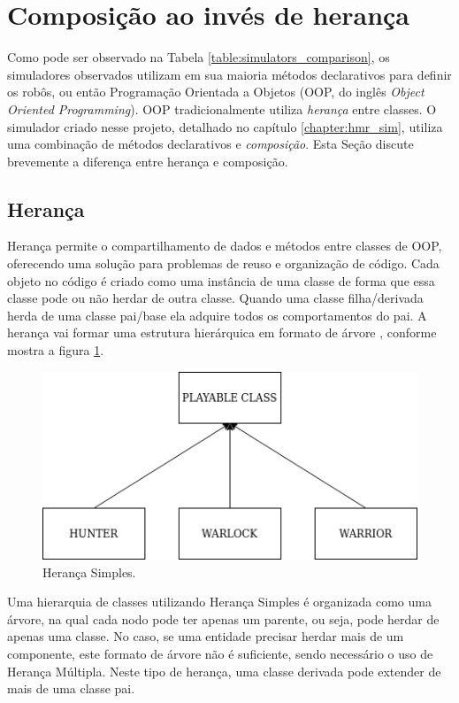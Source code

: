 \section{Composição ao invés de herança}
\label{sec:heranca_composicao}

Como pode ser observado na Tabela \ref{table:simulators_comparison}, os simuladores observados utilizam em sua maioria métodos declarativos para definir os robôs, ou então Programação Orientada a Objetos (OOP, do inglês \textit{Object Oriented Programming}). OOP tradicionalmente utiliza \emph{herança} entre classes. O simulador criado nesse projeto, detalhado no capítulo \ref{chapter:hmr_sim}, utiliza uma combinação de métodos declarativos e \emph{composição}. Esta Seção discute brevemente a diferença entre herança e composição.

\subsection{Herança}
Herança permite o compartilhamento de dados e métodos entre classes de OOP, oferecendo uma solução para problemas de reuso e organização de código. Cada objeto no código é criado como uma instância de uma classe de forma que essa classe pode ou não herdar de outra classe. Quando uma classe filha/derivada herda de uma classe pai/base ela adquire todos os comportamentos do pai. A herança vai formar uma estrutura hierárquica em formato de árvore \cite{composition}, conforme mostra a figura \ref{fig:heranca}.

\begin{figure}
\centering
\includegraphics[scale=0.5]{imagens/heranca.png}
\caption{Herança Simples.} 
\label{fig:heranca}
\end{figure}

Uma hierarquia de classes utilizando Herança Simples é organizada como uma árvore, na qual cada nodo pode ter apenas um parente, ou seja, pode herdar de apenas uma classe. No caso, se uma entidade precisar herdar mais de um componente, este formato de árvore não é suficiente, sendo necessário o uso de Herança Múltipla. Neste tipo de herança, uma classe derivada pode extender de mais de uma classe pai.

